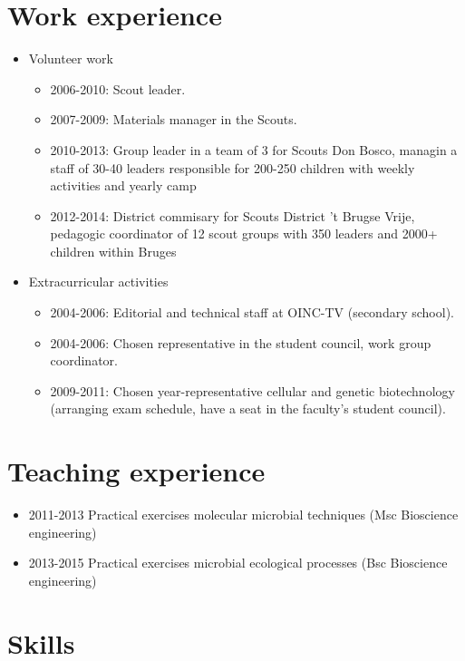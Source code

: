\documentclass[a4paper,11pt,oneside]{article}
\begin{document}
\section*{Work experience}
\begin{itemize}
\item Volunteer work
	\begin{itemize}
	\item 2006-2010: Scout leader.
	\item 2007-2009: Materials manager in the Scouts.
  \item 2010-2013: Group leader in a team of 3 for Scouts Don Bosco, managin a staff of 30-40 leaders responsible for 200-250 children with weekly activities and yearly camp
  \item 2012-2014: District commisary for Scouts District 't Brugse Vrije, pedagogic coordinator of 12 scout groups with 350 leaders and 2000+ children within Bruges
	\end{itemize}
\item Extracurricular activities
	\begin{itemize}
	\item 2004-2006: Editorial and technical staff at OINC-TV (secondary school). 
	\item 2004-2006: Chosen representative in the student council, work group coordinator.
	\item 2009-2011: Chosen year-representative cellular and genetic biotechnology (arranging exam schedule, have a seat in the faculty's student council).
	\end{itemize}
\end{itemize}

\section*{Teaching experience}
\begin{itemize}
  \item 2011-2013 Practical exercises molecular microbial techniques (Msc Bioscience engineering)
  \item 2013-2015 Practical exercises microbial ecological processes (Bsc Bioscience engineering)
\end{itemize}

\section*{Skills}
\end{document}
